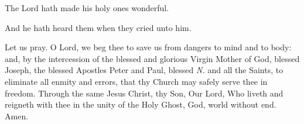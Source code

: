 \noindent \vv The Lord hath made his holy ones wonderful.

\noindent \rr And he hath heard them when they cried unto him.

\noindent Let us pray. O Lord, we beg thee to save us from dangers to mind and to body: and, by the intercession of the blessed and glorious Virgin Mother of God, blessed Joseph, the blessed Apostles Peter and Paul, blessed \textit{N.} and all the Saints, to eliminate all enmity and errors, that thy Church may safely serve thee in freedom.
Through the same Jesus Christ, thy Son, Our Lord, Who liveth and reigneth with thee in the unity of the Holy Ghost, God, world without end. Amen.